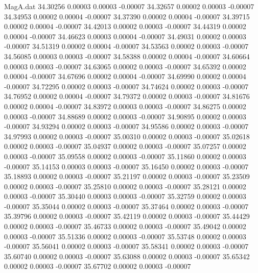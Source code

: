 \begin{filecontents}{MagA.dat}
  34.30256    0.00003    0.00003   -0.00007
  34.32657    0.00002    0.00003   -0.00007
  34.34953    0.00002    0.00004   -0.00007
  34.37390    0.00002    0.00004   -0.00007
  34.39715    0.00002    0.00004   -0.00007
  34.42013    0.00002    0.00003   -0.00007
  34.44319    0.00002    0.00004   -0.00007
  34.46623    0.00003    0.00004   -0.00007
  34.49031    0.00002    0.00003   -0.00007
  34.51319    0.00002    0.00004   -0.00007
  34.53563    0.00002    0.00003   -0.00007
  34.56085    0.00003    0.00003   -0.00007
  34.58388    0.00002    0.00004   -0.00007
  34.60664    0.00003    0.00003   -0.00007
  34.63065    0.00002    0.00003   -0.00007
  34.65392    0.00002    0.00004   -0.00007
  34.67696    0.00002    0.00004   -0.00007
  34.69990    0.00002    0.00004   -0.00007
  34.72295    0.00002    0.00003   -0.00007
  34.74624    0.00002    0.00003   -0.00007
  34.76952    0.00002    0.00004   -0.00007
  34.79372    0.00002    0.00003   -0.00007
  34.81676    0.00002    0.00004   -0.00007
  34.83972    0.00003    0.00003   -0.00007
  34.86275    0.00002    0.00003   -0.00007
  34.88689    0.00002    0.00003   -0.00007
  34.90895    0.00002    0.00003   -0.00007
  34.93294    0.00002    0.00003   -0.00007
  34.95586    0.00002    0.00003   -0.00007
  34.97993    0.00002    0.00003   -0.00007
  35.00310    0.00002    0.00003   -0.00007
  35.02618    0.00002    0.00003   -0.00007
  35.04937    0.00002    0.00003   -0.00007
  35.07257    0.00002    0.00003   -0.00007
  35.09558    0.00002    0.00003   -0.00007
  35.11860    0.00002    0.00003   -0.00007
  35.14153    0.00003    0.00003   -0.00007
  35.16450    0.00002    0.00003   -0.00007
  35.18893    0.00002    0.00003   -0.00007
  35.21197    0.00002    0.00003   -0.00007
  35.23509    0.00002    0.00003   -0.00007
  35.25810    0.00002    0.00003   -0.00007
  35.28121    0.00002    0.00003   -0.00007
  35.30440    0.00003    0.00003   -0.00007
  35.32759    0.00002    0.00003   -0.00007
  35.35044    0.00002    0.00003   -0.00007
  35.37464    0.00002    0.00003   -0.00007
  35.39796    0.00002    0.00003   -0.00007
  35.42119    0.00002    0.00003   -0.00007
  35.44429    0.00002    0.00003   -0.00007
  35.46733    0.00002    0.00003   -0.00007
  35.49042    0.00002    0.00003   -0.00007
  35.51336    0.00002    0.00003   -0.00007
  35.53748    0.00002    0.00003   -0.00007
  35.56041    0.00002    0.00003   -0.00007
  35.58341    0.00002    0.00003   -0.00007
  35.60740    0.00002    0.00003   -0.00007
  35.63088    0.00002    0.00003   -0.00007
  35.65342    0.00002    0.00003   -0.00007
  35.67702    0.00002    0.00003   -0.00007

\end{filecontents}
